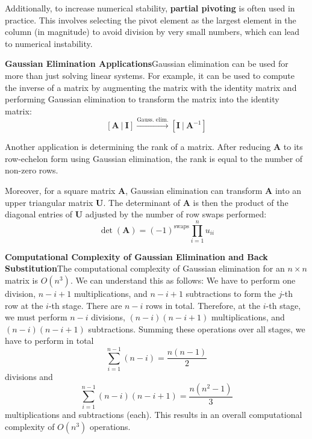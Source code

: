 Additionally, to increase numerical stability, \textbf{partial pivoting} is often used in practice. This involves selecting the pivot element as the largest element in the column (in magnitude) to avoid division by very small numbers, which can lead to numerical instability.

\textbf{Gaussian Elimination Applications}\quad Gaussian elimination can be used for more than just solving linear systems. For example, it can be used to compute the inverse of a matrix by augmenting the matrix with the identity matrix and performing Gaussian elimination to transform the matrix into the identity matrix:
\begin{equation*}
    \left[ \mathbf{A} \ \vert \ \mathbf{I} \right] \xrightarrow{\text{Gauss. elim.}} \left[ \mathbf{I} \ \vert \ \mathbf{A}^{-1} \right]
\end{equation*}

Another application is determining the rank of a matrix. After reducing $ \mathbf{A} $ to its row-echelon form using Gaussian elimination, the rank is equal to the number of non-zero rows. 

Moreover, for a square matrix $ \mathbf{A} $, Gaussian elimination can transform $ \mathbf{A} $ into an upper triangular matrix $ \mathbf{U} $. The determinant of $ \mathbf{A} $ is then the product of the diagonal entries of $ \mathbf{U} $ adjusted by the number of row swaps performed:
\begin{equation*}
    \det(\mathbf{A}) = (-1)^{\text{swaps}} \prod_{i=1}^{n} u_{ii}
\end{equation*}

\textbf{Computational Complexity of Gaussian Elimination and Back Substitution}\quad The computational complexity of Gaussian elimination for an $ n \times n $ matrix is $ O(n^3) $. We can understand this as follows: We have to perform one division, $n - i + 1$ multiplications, and $n - i + 1$ subtractions to form the $j$-th row at the $i$-th stage. There are $n - i$ rows in total. Therefore, at the $i$-th stage, we must perform $n - i$ divisions, $(n - i)(n - i + 1)$ multiplications, and $(n - i)(n - i + 1)$ subtractions. Summing these operations over all stages, we have to perform in total
\begin{equation*}
    \sum_{i=1}^{n-1} (n - i) = \frac{n(n - 1)}{2}
\end{equation*}
divisions and
\begin{equation*}
    \sum_{i=1}^{n-1} (n - i)(n - i + 1) = \frac{n(n^2 - 1)}{3}
\end{equation*}
multiplications and subtractions (each). This results in an overall computational complexity of $ O(n^3) $ operations. 

